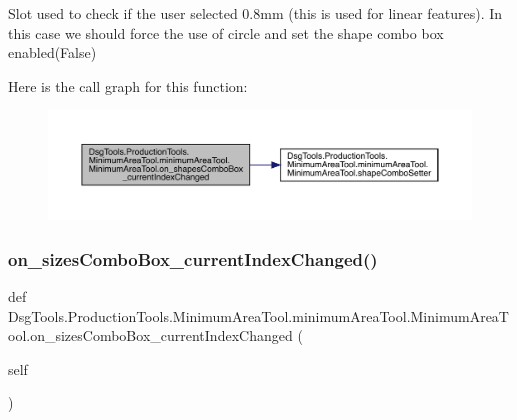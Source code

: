\begin{DoxyVerb}Slot used to check if the user selected 0.8mm (this is used for linear features).
In this case we should force the use of circle and set the shape combo box enabled(False)
\end{DoxyVerb}
 Here is the call graph for this function\+:
\nopagebreak
\begin{figure}[H]
\begin{center}
\leavevmode
\includegraphics[width=350pt]{class_dsg_tools_1_1_production_tools_1_1_minimum_area_tool_1_1minimum_area_tool_1_1_minimum_area_tool_a8387c36dc1e57144fedd4ce6c3e198c1_cgraph}
\end{center}
\end{figure}
\mbox{\label{class_dsg_tools_1_1_production_tools_1_1_minimum_area_tool_1_1minimum_area_tool_1_1_minimum_area_tool_ab2f5de467fbe307eea2d5c690bcaed1b}} 
\subsubsection{\texorpdfstring{on\+\_\+sizes\+Combo\+Box\+\_\+current\+Index\+Changed()}{on\_sizesComboBox\_currentIndexChanged()}}
{\footnotesize\ttfamily def Dsg\+Tools.\+Production\+Tools.\+Minimum\+Area\+Tool.\+minimum\+Area\+Tool.\+Minimum\+Area\+Tool.\+on\+\_\+sizes\+Combo\+Box\+\_\+current\+Index\+Changed (\begin{DoxyParamCaption}\item[{}]{self }\end{DoxyParamCaption})}


